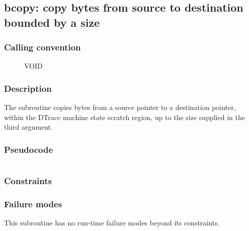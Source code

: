 \clearpage
{}
{}
\label{subr:bcopy}
\subsection*{bcopy: copy bytes from source to destination bounded by a
size}

\subsubsection*{Calling convention}

\begin{description}
\item[] VOID
\end{description}

\subsubsection*{Description}

The  subroutine copies bytes from a source pointer
to a destination pointer, within the DTrace machine state scratch
region, up to the size supplied in the third argument.
\subsubsection*{Pseudocode}

\begin{verbatim}
\end{verbatim}

\subsubsection*{Constraints}

\subsubsection*{Failure modes}

This subroutine has no run-time failure modes beyond its constraints.
